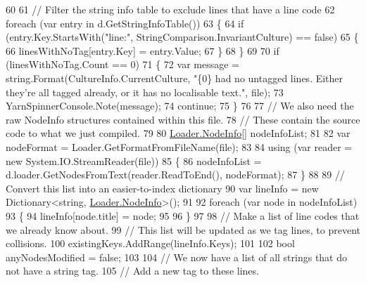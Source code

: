 \begin{DoxyCode}
60 
61                 \textcolor{comment}{// Filter the string info table to exclude lines that have a line code}
62                 \textcolor{keywordflow}{foreach} (var entry \textcolor{keywordflow}{in} d.GetStringInfoTable())
63                 \{
64                     \textcolor{keywordflow}{if} (entry.Key.StartsWith(\textcolor{stringliteral}{"line:"}, StringComparison.InvariantCulture) == \textcolor{keyword}{false})
65                     \{
66                         linesWithNoTag[entry.Key] = entry.Value;
67                     \}
68                 \}
69 
70                 \textcolor{keywordflow}{if} (linesWithNoTag.Count == 0)
71                 \{
72                     var message = string.Format(CultureInfo.CurrentCulture, \textcolor{stringliteral}{"\{0\} had no untagged lines.
       Either they're all tagged already, or it has no localisable text."}, file);
73                     YarnSpinnerConsole.Note(message);
74                     \textcolor{keywordflow}{continue};
75                 \}
76 
77                 \textcolor{comment}{// We also need the raw NodeInfo structures contained within this file.}
78                 \textcolor{comment}{// These contain the source code to what we just compiled.}
79 
80                 \hyperlink{a00142}{Loader.NodeInfo}[] nodeInfoList;
81 
82                 var nodeFormat = Loader.GetFormatFromFileName(file);
83 
84                 \textcolor{keyword}{using} (var reader = \textcolor{keyword}{new} System.IO.StreamReader(file))
85                 \{
86                     nodeInfoList = d.loader.GetNodesFromText(reader.ReadToEnd(), nodeFormat);
87                 \}
88 
89                 \textcolor{comment}{// Convert this list into an easier-to-index dictionary}
90                 var lineInfo = \textcolor{keyword}{new} Dictionary<string, \hyperlink{a00142}{Loader.NodeInfo}>();
91 
92                 \textcolor{keywordflow}{foreach} (var node \textcolor{keywordflow}{in} nodeInfoList)
93                 \{
94                     lineInfo[node.title] = node;
95 
96                 \}
97 
98                 \textcolor{comment}{// Make a list of line codes that we already know about.}
99                 \textcolor{comment}{// This list will be updated as we tag lines, to prevent collisions.}
100                 existingKeys.AddRange(lineInfo.Keys);
101 
102                 \textcolor{keywordtype}{bool} anyNodesModified = \textcolor{keyword}{false};
103 
104                 \textcolor{comment}{// We now have a list of all strings that do not have a string tag.}
105                 \textcolor{comment}{// Add a new tag to these lines.}

\end{DoxyCode}
